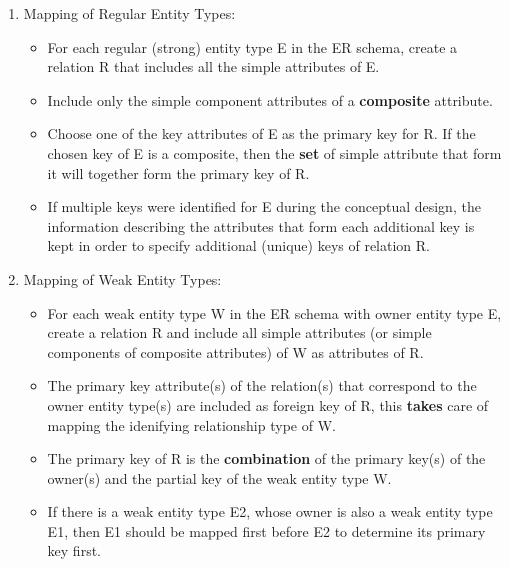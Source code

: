 \documentclass[10pt]{article}
\begin{document}
\begin{enumerate}
	\item Mapping of Regular Entity Types:
	\begin{itemize}
		\item For each regular (strong) entity type E in the ER schema, create a relation R that includes all the simple attributes of E.
		\item Include only the simple component attributes of a \textbf{composite} attribute.
		\item Choose one of the key attributes of E as the primary key for R. If the chosen key of E is a composite, then the \textbf{set} of simple attribute that form it will together form the primary key of R.
		\item If multiple keys were identified for E during the conceptual design, the information describing the attributes that form each additional key is kept in order to specify additional (unique) keys of relation R.
	\end{itemize}

	\item Mapping of Weak Entity Types:
	\begin{itemize}
		\item For each weak entity type W in the ER schema with owner entity type E, create a relation R and include all simple attributes (or simple components of composite attributes) of W as attributes of R.
		\item The primary key attribute(s) of the relation(s) that correspond to the owner entity type(s) are included as foreign key of R, this \textbf{takes} care of mapping the idenifying relationship type of W.
		\item The primary key of R is the \textbf{combination} of the primary key(s) of the owner(s) and the partial key of the weak entity type W.
		\item If there is a weak entity type E2, whose owner is also a weak entity type E1, then E1 should be mapped first before E2 to determine its primary key first.
	\end{itemize}


\end{enumerate}
\end{document}
